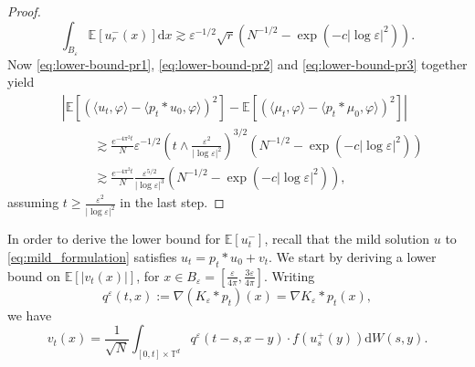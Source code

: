 \documentclass[a4paper,12pt]{article}
\newcommand{\mathd}{\mathrm{d}}
\newcommand{\E}{\mathbb{E}}
\begin{document}
\begin{proof}
    \begin{equation}\label{eq:lower-bound-pr3}
        \int_{B_\varepsilon} \mathbb{E}[u_r^{-}(x)] \mathd x \gtrsim \varepsilon^{-1/2}  \sqrt{r}(N^{-1/2} - \exp(-c|\log \varepsilon|^2)).
    \end{equation} 
    Now \eqref{eq:lower-bound-pr1}, \eqref{eq:lower-bound-pr2} and \eqref{eq:lower-bound-pr3} together yield
    \begin{align*}
        & |\E[(\langle u_t,\varphi\rangle - \langle p_t \ast u_0, \varphi\rangle)^2] - \E[(\langle \mu_t, \varphi\rangle - \langle p_t \ast \mu_0, \varphi\rangle)^2]|\\
        & \hspace{30pt} \gtrsim \frac{e^{-4\pi^2 t}}{N}  \varepsilon^{-1/2}  \left(t \wedge \frac{\varepsilon^2}{|\log \varepsilon|^2}\right)^{3/2} (N^{-1/2} - \exp(-c|\log\varepsilon|^2))\\
        & \hspace{30pt} \gtrsim \frac{e^{-4\pi^2 t}}{N}  \frac{\varepsilon^{5/2}}{|\log \varepsilon|^{3}} (N^{-1/2} - \exp(-c|\log\varepsilon|^2)),
    \end{align*}
    assuming $t \geq \frac{\varepsilon^2}{|\log \varepsilon|^2}$ in the last step.   
\end{proof}



In order to derive the lower bound for $\E[u_t^-]$, recall that the mild solution $u$ to \eqref{eq:mild_formulation} satisfies $u_t = p_t \ast u_0 + v_t$. We start by deriving a lower bound on $\mathbb{E}[| v_t(x)|]$, for $x \in B_\varepsilon = [\frac{\varepsilon}{4 \pi}, \frac{3 \varepsilon}{4 \pi}]$. Writing
\begin{equation}
q^\varepsilon (t,x) := \nabla(K_\varepsilon \ast p_t)(x) = \nabla K_\varepsilon \ast p_t(x),
\end{equation}
we have
\begin{equation}
    v_t(x) =  \frac{1}{\sqrt{N}} \int_{[0, t] \times \mathbb{T}^d} q^\varepsilon(t-s,x-y)\cdot f(u_s^+(y)) \mathd W(s,y).
\end{equation}    
\end{document}
